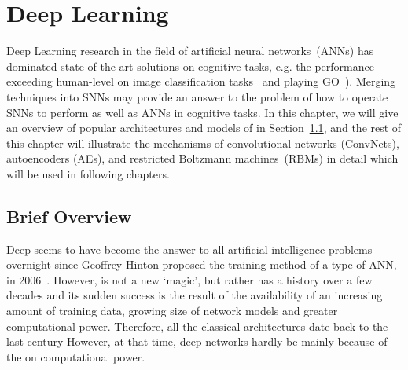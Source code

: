 \chapter{Deep Learning}
\label{cha:dnn}
Deep Learning research in the field of artificial neural networks~(ANNs) has dominated state-of-the-art solutions on cognitive tasks, e.g. the performance exceeding human-level  on image classification tasks~\citep{he2015delving} and playing GO~\citep{silver2016mastering}).
Merging \protect{} \protect{} techniques into SNNs may provide an answer to the problem of how to operate SNNs to perform as well as ANNs in cognitive tasks. 
In this chapter, we will give an overview of popular architectures and models of \protect{} \protect{} in Section~\ref{sec:dl_history}, and the rest of this chapter will illustrate the mechanisms of convolutional networks (ConvNets), autoencoders (AEs), and restricted Boltzmann machines~(RBMs) in detail which will be used in following chapters.

\section{Brief Overview}
\label{sec:dl_history}
Deep \protect{} \protect{} seems to have become the answer to all artificial intelligence problems overnight since Geoffrey Hinton proposed the training method of a type of ANN, \protect{} \protect{} in 2006~\citep{hinton2006fast}.
However, \protect{} \protect{} is not a new `magic', but rather has a history over a few decades and its sudden success is the result of the availability of an increasing amount of training data, \protect{} growing size of network models and greater computational power.
Therefore, all the classical \protect{} \protect{} architectures date back to the last century \protect{} \protect{}
However, at that time, deep networks \protect{} \protect{} hardly \protect{} be \protect{} \protect{} mainly because of the \protect{} \protect{} on computational power.


